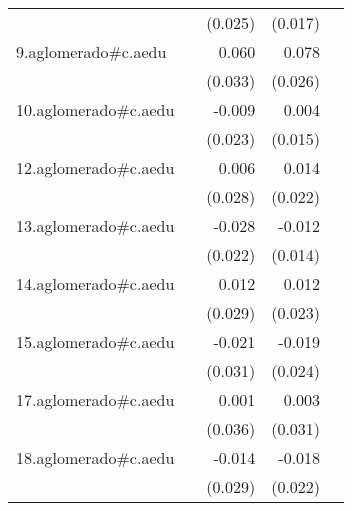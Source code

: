{\begin{longtable}{l*{4}{D{.}{.}{-1}}}
            &                     &     (0.025)         &     (0.017)         &                     \\
\addlinespace
9.aglomerado#c.aedu&                     &       0.060         &       0.078\sym{**} &                     \\
            &                     &     (0.033)         &     (0.026)         &                     \\
\addlinespace
10.aglomerado#c.aedu&                     &      -0.009         &       0.004         &                     \\
            &                     &     (0.023)         &     (0.015)         &                     \\
\addlinespace
12.aglomerado#c.aedu&                     &       0.006         &       0.014         &                     \\
            &                     &     (0.028)         &     (0.022)         &                     \\
\addlinespace
13.aglomerado#c.aedu&                     &      -0.028         &      -0.012         &                     \\
            &                     &     (0.022)         &     (0.014)         &                     \\
\addlinespace
14.aglomerado#c.aedu&                     &       0.012         &       0.012         &                     \\
            &                     &     (0.029)         &     (0.023)         &                     \\
\addlinespace
15.aglomerado#c.aedu&                     &      -0.021         &      -0.019         &                     \\
            &                     &     (0.031)         &     (0.024)         &                     \\
\addlinespace
17.aglomerado#c.aedu&                     &       0.001         &       0.003         &                     \\
            &                     &     (0.036)         &     (0.031)         &                     \\
\addlinespace
18.aglomerado#c.aedu&                     &      -0.014         &      -0.018         &                     \\
            &                     &     (0.029)         &     (0.022)         &                     \\

\end{longtable}}
